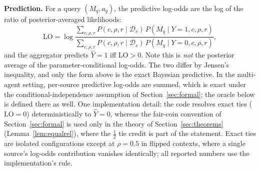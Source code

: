 \textbf{Prediction.} For a query $(M_q, a_q)$, the predictive log-odds are
the log of the ratio of posterior-averaged likelihoods:
\begin{equation}
\mathrm{LO} =
\log\frac{\sum_{c,\rho,r} P(c,\rho,r \mid \mathcal{D}_s)\,
P(M_q \mid Y=1, c,\rho,r)}
{\sum_{c,\rho,r} P(c,\rho,r \mid \mathcal{D}_s)\,
P(M_q \mid Y=0, c,\rho,r)},
\end{equation}
and the aggregator predicts $\hat{Y} = 1$ iff $\mathrm{LO} > 0$. Note this
is \emph{not} the posterior average of the parameter-conditional
log-odds. The two differ by Jensen's inequality, and only the form above
is the exact Bayesian predictive. In the multi-agent setting, per-source
predictive log-odds are summed, which is exact under the
conditional-independence assumption of Section~\ref{sec:formal}; the
oracle below is defined there as well. One implementation detail:
the code resolves exact ties ($\mathrm{LO} = 0$) deterministically
to $\hat{Y} = 0$, whereas the fair-coin convention of
Section~\ref{sec:formal} is used only in the theory of
Section~\ref{sec:theorems} (Lemma~\ref{lem:equalrel}), where the
$\tfrac12$ tie credit is part of the statement. Exact ties are
isolated configurations except at $\rho = 0.5$ in flipped contexts,
where a single source's log-odds contribution vanishes identically;
all reported numbers use the implementation's rule.
